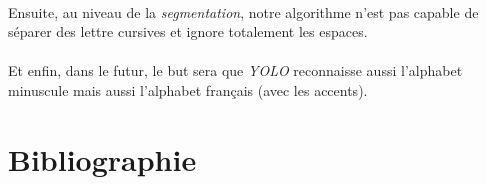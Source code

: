 \documentclass[a4paper]{article}
\begin{document}
		\paragraph{}
			Ensuite, au niveau de la \emph{segmentation}, notre algorithme n'est pas capable de séparer des lettre cursives et ignore totalement les espaces.
		\paragraph{}
			Et enfin, dans le futur, le but sera que \emph{YOLO} reconnaisse aussi l'alphabet minuscule mais aussi l'alphabet français (avec les accents).
	\newpage
	\section*{Bibliographie}
	\newpage
\end{document}
